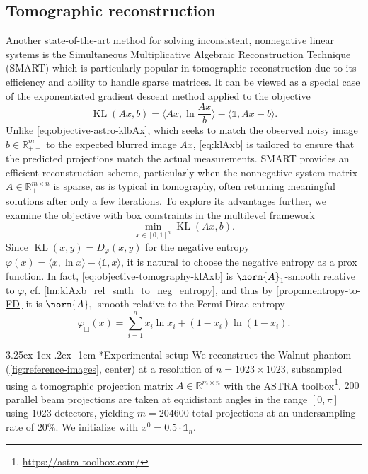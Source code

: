 \documentclass[11pt,reqno]{amsart}
\makeatletter
\numberwithin{equation}{section}
\numberwithin{figure}{section}
\theoremstyle{plain}
\theoremstyle{definition}
\newcommand{\R}{\mathbb{R}}
\newcommand{\la}{\langle}
\newcommand{\ra}{\rangle}
\newcommand{\vphi}{\varphi}
\newcommand{\eins}{\mathbb{1}}
\DeclareMathOperator{\KL}{KL}
\renewcommand\paragraph{\@startsection{paragraph}{4}{0pt}%
  {3.25ex \@plus 1ex \@minus .2ex}%
  {-1em}
  {\normalfont\itshape}*}
\makeatother
\begin{document}
\subsection{Tomographic reconstruction} \label{sec:tomographic_reconstruction}
Another state-of-the-art method for solving inconsistent, nonnegative linear systems is the Simultaneous Multiplicative Algebraic Reconstruction Technique (SMART) \cite{Andersen:1984,Atkinson_Soria_2009} which is particularly popular in tomographic reconstruction due to its efficiency and ability to handle sparse matrices. It can be viewed as a special case of the exponentiated gradient descent method applied to the objective 
\begin{equation}\label{eq:klAxb}
    \KL(Ax,b) = \la Ax, \ln \frac{Ax}{b} \ra - \la \eins, Ax - b \ra.
\end{equation} 
Unlike \eqref{eq:objective-astro-klbAx}, which seeks to match the observed noisy image $b \in \R^m_{++}$ to the expected blurred image $Ax$, \eqref{eq:klAxb} is tailored to ensure that the predicted projections match the actual measurements. SMART provides an efficient reconstruction scheme, particularly when the nonnegative system matrix $A \in \R^{m \times n}_+$ is sparse, as is typical in tomography, often returning meaningful solutions after only a few iterations. To explore its advantages further, we examine the objective with box constraints in the multilevel framework
\begin{equation} \label{eq:objective-tomography-klAxb}
    \min_{x \in [0,1]^n} \KL(Ax,b).
\end{equation}
Since $\KL(x,y) = D_\vphi(x,y)$ for the negative entropy $\vphi(x) = \la x, \ln x \ra - \la \eins, x \ra$, it is natural to choose the negative entropy as a prox function. In fact, \eqref{eq:objective-tomography-klAxb} is $\norm{A}_1$-smooth relative to $\vphi$, cf. \cref{lm:klAxb_rel_smth_to_neg_entropy}, and thus by \cref{prop:nnentropy-to-FD} it is $\norm{A}_1$-smooth relative to the Fermi-Dirac entropy
\begin{equation}
    \vphi_\Box(x) = \sum_{i=1}^n x_i\ln x_i + (1-x_i)\ln(1-x_i).
\end{equation}

\paragraph{Experimental setup} We reconstruct the Walnut phantom (\cref{fig:reference-images}, center) at a resolution of $n = 1023 \times 1023$, subsampled using a tomographic projection matrix $A\in\mathbb{R}^{m\times n}$ with the ASTRA toolbox\footnote{\url{https://astra-toolbox.com/}}. $200$ parallel beam projections are taken at equidistant angles in the range $[0, \pi]$ using $1023$ detectors, yielding $m = 204600$ total projections at an undersampling rate of $20\%$. We initialize with $x^0 = 0.5 \cdot \eins_n$.
\end{document}
